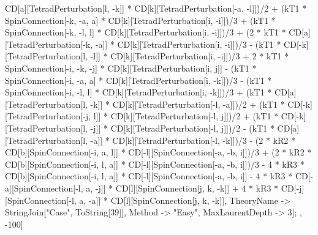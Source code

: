 CD[a][TetradPerturbation[l, -k]] * CD[k][TetradPerturbation[-a, -l]])/2 + (kT1 * SpinConnection[-k, -a, a] * CD[k][TetradPerturbation[i, -i]])/3 + (kT1 * SpinConnection[-k, -l, l] * CD[k][TetradPerturbation[i, -i]])/3 + (2 * kT1 * CD[a][TetradPerturbation[-k, -a]] * CD[k][TetradPerturbation[i, -i]])/3 - (kT1 * CD[-k][TetradPerturbation[l, -l]] * CD[k][TetradPerturbation[i, -i]])/3 + 2 * kT1 * SpinConnection[-i, -k, -j] * CD[k][TetradPerturbation[i, j]] - (kT1 * SpinConnection[-i, -a, a] * CD[k][TetradPerturbation[i, -k]])/3 - (kT1 * SpinConnection[-i, -l, l] * CD[k][TetradPerturbation[i, -k]])/3 + (kT1 * CD[a][TetradPerturbation[l, -k]] * CD[k][TetradPerturbation[-l, -a]])/2 + (kT1 * CD[-k][TetradPerturbation[-j, l]] * CD[k][TetradPerturbation[-l, j]])/2 + (kT1 * CD[-k][TetradPerturbation[l, -j]] * CD[k][TetradPerturbation[-l, j]])/2 - (kT1 * CD[a][TetradPerturbation[l, -a]] * CD[k][TetradPerturbation[-l, -k]])/3 - (2 * kR2 * CD[b][SpinConnection[-i, a, l]] * CD[-l][SpinConnection[-a, -b, i]])/3 + (2 * kR2 * CD[b][SpinConnection[-i, l, a]] * CD[-l][SpinConnection[-a, -b, i]])/3 - 4 * kR3 * CD[b][SpinConnection[-i, l, a]] * CD[-l][SpinConnection[-a, -b, i]] - 4 * kR3 * CD[-a][SpinConnection[-l, a, -j]] * CD[l][SpinConnection[j, k, -k]] + 4 * kR3 * CD[-j][SpinConnection[-l, a, -a]] * CD[l][SpinConnection[j, k, -k]], TheoryName -> StringJoin["Case", ToString[39]], Method -> "Easy", MaxLaurentDepth -> 3]; , -100]